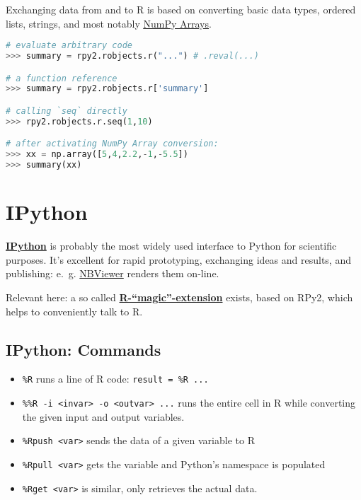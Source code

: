 \documentclass[
paper=128mm:96mm, %
fontsize=11pt, %
pagesize, %
parskip=half-, %
]{scrartcl} %
\theoremstyle{mythmstyle} %
\def\shorttitle{R meets Python}
\newcommand*{\runninghead}{\shorttitle} %
\newcommand*{\newhead}[1]{\renewcommand*{\runninghead}{\shorttitle: #1}}
\begin{document}
Exchanging data from and to R is based on
converting basic data types, ordered lists, strings,
and most notably
\href{http://wiki.scipy.org/Tentative_NumPy_Tutorial}{\uline{NumPy Arrays}}.

\clearpage
\newhead{RPy2: Example}

\begin{lstlisting}[language=python]
# evaluate arbitrary code
>>> summary = rpy2.robjects.r("...") # .reval(...)

# a function reference
>>> summary = rpy2.robjects.r['summary']

# calling `seq` directly
>>> rpy2.robjects.r.seq(1,10)

# after activating NumPy Array conversion:
>>> xx = np.array([5,4,2.2,-1,-5.5])
>>> summary(xx)
\end{lstlisting}


\clearpage
\newhead{IPython}
\section{IPython}

\href{http://www.ipython.org}{\textbf{IPython}} is probably the most
widely used interface to Python for scientific purposes.
It's excellent for rapid prototyping, exchanging ideas and results,
and publishing: e.~g. \href{http://nbviewer.ipython.org/}{NBViewer} renders them on-line.

Relevant here: a so called
\href{http://ipython.org/ipython-doc/dev/config/extensions/rmagic.html}
{\textbf{R-``magic''-extension}} exists,
based on RPy2, which helps to conveniently talk to R.

\clearpage
\newhead{IPython: Commands}
\subsection{IPython: Commands}

\begin{itemize}
\item{\texttt{\%R}} runs a line of R code: \texttt{result = \%R ...}
\item{\texttt{\%\%R -i <invar> -o <outvar> ...}}
runs the entire cell in R while converting the given input and output variables.
\item{\texttt{\%Rpush <var>}} sends the data of a given variable to R
\item{\texttt{\%Rpull <var>}} gets the variable and Python's namespace is populated
\item{\texttt{\%Rget <var>}} is similar, only retrieves the actual data.
\end{itemize}
\end{document}
